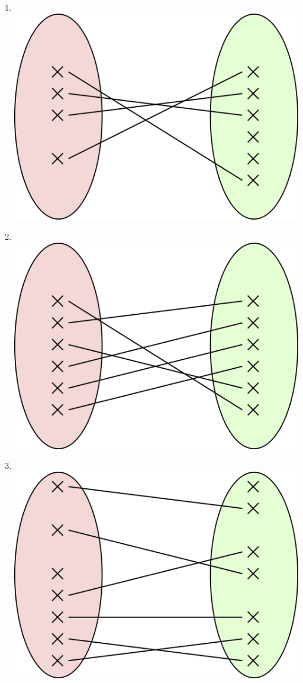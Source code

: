 \begin{exercice}[]
\begin{multicols}{2}
\begin{enumerate}
            \item 	\ \\\includegraphics[width=\myw]{ensembles/img/6.png}
            \item 	\ \\\includegraphics[width=\myw]{ensembles/img/7.png}
            \item 	\ \\\includegraphics[width=\myw]{ensembles/img/8.png}

\end{enumerate}
\end{multicols}
\end{exercice}
